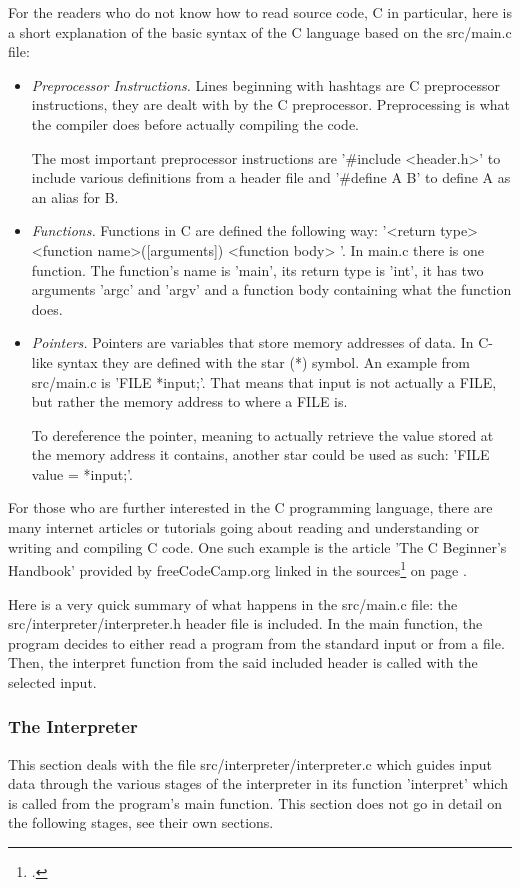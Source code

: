 \documentclass[12pt,a4paper,man]{apa7}
\begin{document}
For the readers who do not know how to read source code, C in particular, here is a short
explanation of the basic syntax of the C language based on the src/main.c file:
\begin{itemize}
    \item \emph{Preprocessor Instructions.} Lines beginning with hashtags are
        C preprocessor instructions, they are dealt with by the C preprocessor.
        Preprocessing is what the compiler does before actually compiling the
        code.

        The most important preprocessor instructions are '\#include <header.h>'
        to include various definitions from a header file and '\#define A B' to
        define A as an alias for B.
    \item \emph{Functions.} Functions in C are defined the following way:
        '<return type> <function name>([arguments]) { <function body> }'.
        In main.c there is one function. The function's name is 'main', its
        return type is 'int', it has two arguments 'argc' and 'argv' and a
        function body containing what the function does.
    \item \emph{Pointers.} Pointers are variables that store memory addresses
        of data. In C-like syntax they are defined with the star (*) symbol.
        An example from src/main.c is 'FILE *input;'. That means that input is not
        actually a FILE, but rather the memory address to where a FILE is.

        To dereference the pointer, meaning to actually retrieve the value stored
        at the memory address it contains, another star could be used as such:
        'FILE value = *input;'.
\end{itemize}

For those who are further interested in the C programming language, there are
many internet articles or tutorials going about reading and understanding or
writing and compiling C code. One such example is the article 'The C Beginner's
Handbook' provided by freeCodeCamp.org linked in the sources\footcite{freeCodeCamp}
on page \pageref{bibliography}.

Here is a very quick summary of what happens in the src/main.c file: the src/interpreter/interpreter.h
header file is included. In the main function, the program decides to either
read a program from the standard input or from a file. Then, the interpret function
from the said included header is called with the selected input.

\subsubsection{The Interpreter}
This section deals with the file src/interpreter/interpreter.c which guides
input data through the various stages of the \name interpreter in its
function 'interpret' which is called from the program's main function.
This section does not go in detail on the following stages, see their own sections.
\end{document}
